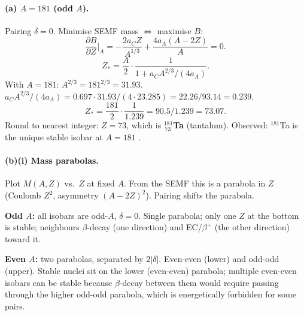 \documentclass[11pt]{article}
\begin{document}
\paragraph{(a) $A=181$ (odd $A$).} Pairing $\delta=0$. Minimise SEMF mass $\Leftrightarrow$ maximise $B$:
\[
\frac{\partial B}{\partial Z}\Big|_A=-\frac{2 a_C Z}{A^{1/3}}+\frac{4 a_A(A-2Z)}{A}=0.
\]
\[
Z_*=\frac{A}{2}\cdot\frac{1}{1+a_C A^{2/3}/(4 a_A)}.
\]
With $A=181$: $A^{2/3}=181^{2/3}=31.93$. $a_C A^{2/3}/(4 a_A)=0.697\cdot 31.93/(4\cdot 23.285)=22.26/93.14=0.239$.
\[
Z_*=\frac{181}{2}\cdot\frac{1}{1.239}=90.5/1.239=73.07.
\]
Round to nearest integer: \textbf{$Z=73$}, which is \textbf{$^{181}_{\,73}$Ta} (tantalum). Observed: $^{181}$Ta is the unique stable isobar at $A=181$ \checkmark.

\paragraph{(b)(i) Mass parabolas.} Plot $M(A,Z)$ vs.\ $Z$ at fixed $A$. From the SEMF this is a parabola in $Z$ (Coulomb $Z^{2}$, asymmetry $(A-2Z)^{2}$). Pairing shifts the parabola.

\textbf{Odd $A$:} all isobars are odd-$A$, $\delta=0$. Single parabola; only one $Z$ at the bottom is stable; neighbours $\beta$-decay (one direction) and EC/$\beta^{+}$ (the other direction) toward it.

\textbf{Even $A$:} two parabolas, separated by $2|\delta|$. Even-even (lower) and odd-odd (upper). Stable nuclei sit on the lower (even-even) parabola; multiple even-even isobars can be stable because $\beta$-decay between them would require passing through the higher odd-odd parabola, which is energetically forbidden for some pairs.

\begin{center}
\end{center}
\end{document}
